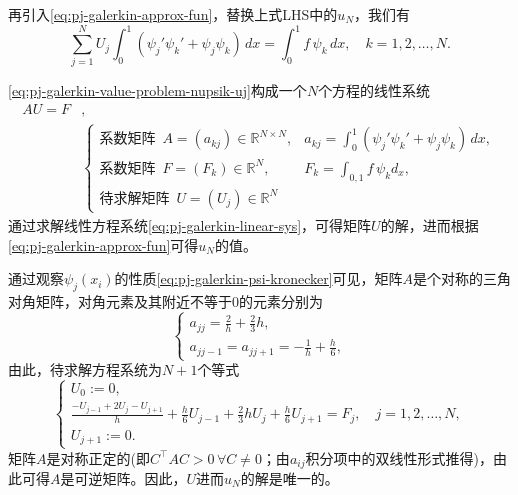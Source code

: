 \begin{subappendices}
再引入\eqref{eq:pj-galerkin-approx-fun}，替换上式LHS中的$u_N$，我们有
\begin{equation}
  \label{eq:pj-galerkin-value-problem-nupsik-uj}
  \sum_{j=1}^{N} U_j \int_{0}^1 \left( \psi_j' \psi_k' + \psi_j \psi_k \right) \, dx = \int_{0}^{1} f \, \psi_k \, dx, \quad k=1,2,\ldots,N.
\end{equation}

\eqref{eq:pj-galerkin-value-problem-nupsik-uj}构成一个$N$个方程的线性系统
\begin{equation}
  \label{eq:pj-galerkin-linear-sys}
\begin{split}
  A U = F&,\\
  &\begin{cases}
    \text{系数矩阵 } \, A=\left( a_{kj} \right) \in \mathbb{R}^{N \times N},& a_{kj} = \int_{0}^1 \left( \psi_j'\psi_k' + \psi_j \psi_k \right) \, dx,\\
    \text{系数矩阵 } \, F=\left( F_k \right) \in \mathbb{R}^{N}, & F_k = \int_{0,1}f \, \psi_k d_x,\\
    \text{待求解矩阵 } \, U=(U_j) \in \mathbb{R}^{N}
  \end{cases}
\end{split}
\end{equation}
通过求解线性方程系统\eqref{eq:pj-galerkin-linear-sys}，可得矩阵$U$的解，进而根据\eqref{eq:pj-galerkin-approx-fun}可得$u_N$的值。


通过观察$\psi_j(x_i)$的性质\eqref{eq:pj-galerkin-psi-kronecker}可见，矩阵$A$是个对称的三角对角矩阵，对角元素及其附近不等于$0$的元素分别为
\begin{equation*}
  \begin{cases}
    a_{jj} = \frac{2}{h} + \frac{2}{3} h, \\
    a_{jj-1} = a_{jj+1} = -\frac{1}{h} + \frac{h}{6},
  \end{cases}
\end{equation*}
由此，待求解方程系统为$N+1$个等式
\begin{equation*}
  \begin{cases}
    U_0 := 0, \\
    \frac{-U_{j-1} + 2U_j - U_{j+1}}{h} + \frac{h}{6} U_{j-1} + \frac{2}{3} h U_j + \frac{h}{6} U_{j+1} = F_j, \quad j=1,2,\ldots,N,\\
    U_{j+1} := 0.
  \end{cases}
\end{equation*}
矩阵$A$是对称正定的(即$C^{\top} A C >0 \, \forall C \neq 0 $；由$a_{ij}$积分项中的双线性形式推得)，由此可得$A$是可逆矩阵。因此，$U$进而$u_N$的解是唯一的。


\end{subappendices}

